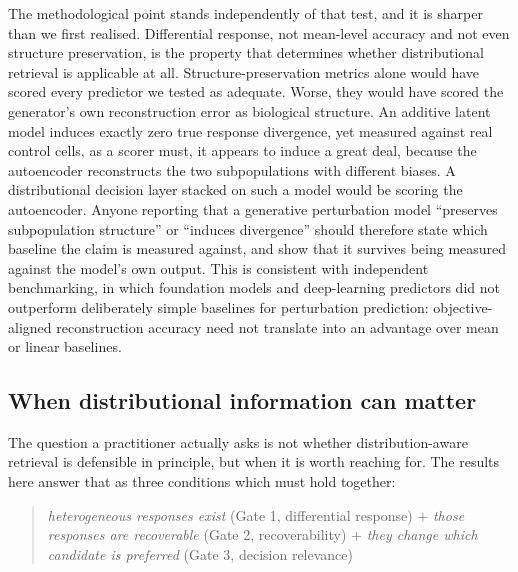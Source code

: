 \documentclass[11pt,letterpaper]{article}
\begin{document}
The methodological point stands independently of that test, and it is sharper than we first
realised. Differential response, not mean-level accuracy and not even structure preservation, is the
property that determines whether distributional retrieval is applicable at all. Structure-preservation
metrics alone would have scored every predictor we tested as adequate. Worse, they would have
scored the generator's own reconstruction error as biological structure. An additive latent model
induces exactly zero true response divergence, yet measured against real control cells, as a scorer
must, it appears to induce a great deal, because the autoencoder reconstructs the two subpopulations
with different biases. A distributional decision layer stacked on such a model would be scoring the
autoencoder. Anyone reporting that a generative perturbation model ``preserves subpopulation
structure'' or ``induces divergence'' should therefore state which baseline the claim is measured
against, and show that it survives being measured against the model's own output. This
is consistent with independent benchmarking, in which foundation models and deep-learning
predictors did not outperform deliberately simple baselines for perturbation
prediction\cite{ref13,ref14}: objective-aligned reconstruction accuracy need not translate into an
advantage over mean or linear baselines.

\subsection*{When distributional information can matter}

The question a practitioner actually asks is not whether distribution-aware retrieval is
defensible in principle, but when it is worth reaching for. The results here answer that as three
conditions which must hold together:

\begin{quote}
\emph{heterogeneous responses exist} (Gate 1, differential response) $+$
\emph{those responses are recoverable} (Gate 2, recoverability) $+$
\emph{they change which candidate is preferred} (Gate 3, decision relevance)
\end{quote}
\end{document}

